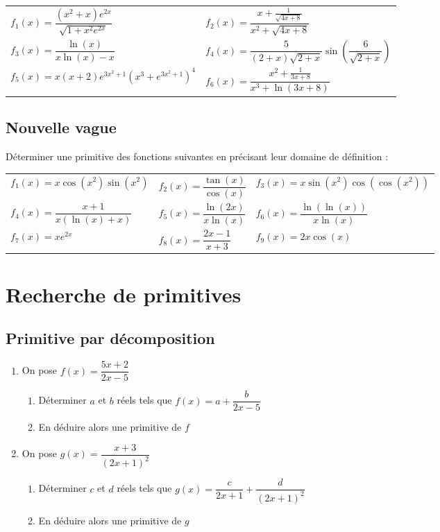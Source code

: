 \documentclass[oneside,12pt]{book}          %
\begin{document}
\renewcommand{\arraystretch}{2.4}
\begin{tabular}{ p{} p{} }
	$f_1(x)=\dfrac{(x^2+x)e^{2x}}{\sqrt{1+x^2e^{2x}}}$ & $f_2(x)=\dfrac{x+\frac{1}{\sqrt{4x+8}}}{x^2+\sqrt{4x+8}}$ \\
	$f_3(x)=\dfrac{\ln(x)}{x\ln(x)-x}$ & $f_4(x)=\dfrac{5}{(2+x)\sqrt{2+x}}\sin\left(\dfrac{6}{\sqrt{2+x}}\right)$ \\
	$f_5(x)=x(x+2)e^{3x^2+1}\left(x^3+e^{3x^2+1}\right)^4$ & $f_6(x)=\dfrac{x^2+\frac{1}{3x+8}}{x^3+\ln(3x+8)}$
\end{tabular}



\subsection{Nouvelle vague}
Déterminer une primitive des fonctions suivantes en précisant leur domaine de définition :

\renewcommand{\arraystretch}{2}
\begin{tabular}{ p{} p{} p{} }
    $f_1(x)=x\cos(x^2)\sin(x^2)$ & $f_2(x)=\dfrac{\tan(x)}{\cos(x)}$ & $f_3(x)=x\sin(x^2)\cos(\cos(x^2))$ \\
    $f_4(x)=\dfrac{x+1}{x\left(\ln(x)+x\right)}$ & $f_5(x)=\dfrac{\ln(2x)}{x\ln(x)}$ & $f_6(x)=\dfrac{\ln\left(\ln(x)\right)}{x\ln(x)}$\\
    $f_7(x)=xe^{2x}$ & $f_8(x)=\dfrac{2x-1}{x+3}$ & $f_9(x)=2x\cos(x)$
\end{tabular}



\section{Recherche de primitives}

\subsection{Primitive par décomposition}
\begin{enumerate}
    \item On pose $f(x)=\dfrac{5x+2}{2x-5}$
    \begin{enumerate}
        \item Déterminer $a$ et $b$ réels tels que $f(x)=a+\dfrac{b}{2x-5}$
        \item En déduire alors une primitive de $f$
    \end{enumerate}
    \item On pose $g(x)=\dfrac{x+3}{(2x+1)^2}$
    \begin{enumerate}
        \item Déterminer $c$ et $d$ réels tels que $g(x)=\dfrac{c}{2x+1}+\dfrac{d}{(2x+1)^2}$
        \item En déduire alors une primitive de $g$
    \end{enumerate}
\end{enumerate}
\end{document}
